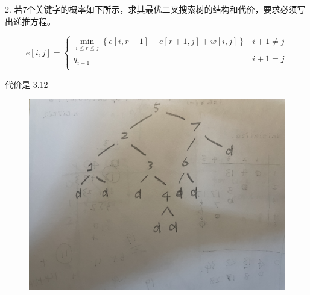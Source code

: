\documentclass[a4paper, 10pt]{ctexart} %
\begin{document}
2. 若7个关键字的概率如下所示，求其最优二叉搜索树的结构和代价，要求必须写出递推方程。



\[
e \left[ i , j  \right] =
\begin{cases}
    \min _{i \le r \le j} \left\{e \left[  i ,r -1  \right]+ e \left[ r+1 , j \right] + w[i,j]\right\} & i +1 \ne j\\
    q_{i-1} & i +1 = j\\ 
\end{cases}
\]

代价是 3.12
\begin{figure}[H]
    \centering
    \includegraphics[scale = 0.5]{IMG_3026.jpg}
\end{figure}
\end{document}
